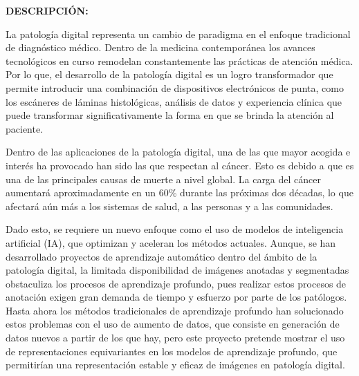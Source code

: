 \documentclass[12pt,letterpaper,final, openany]{scrbook}
\begin{document}
\textbf{DESCRIPCIÓN:}


La patología digital representa un cambio de paradigma en el enfoque tradicional de diagnóstico médico. Dentro de la medicina contemporánea los avances tecnológicos en curso remodelan constantemente las prácticas de atención médica. Por lo que, el desarrollo de la patología digital es un logro transformador que permite introducir una combinación de dispositivos electrónicos de punta, como los escáneres de  láminas histológicas, análisis de datos y experiencia clínica que puede transformar significativamente la forma en que se brinda la atención al paciente.

Dentro de las aplicaciones de la patología digital, una de las que mayor acogida e interés ha provocado han sido las que respectan al cáncer. Esto es debido a que es una de las principales causas de muerte a nivel global. La carga del cáncer aumentará aproximadamente en un 60\% durante las próximas dos décadas, lo que afectará aún más a los sistemas de salud, a las personas y a las comunidades.

Dado esto, se requiere un nuevo enfoque como el uso de modelos de inteligencia artificial (IA), que optimizan y aceleran los métodos actuales. Aunque, se han desarrollado proyectos de aprendizaje automático dentro del ámbito de la patología digital, la limitada disponibilidad de imágenes anotadas y segmentadas obstaculiza los procesos de aprendizaje profundo, pues realizar estos procesos de anotación exigen gran demanda de tiempo y esfuerzo por parte de los patólogos. Hasta ahora los métodos tradicionales de aprendizaje profundo han solucionado estos problemas con el uso de aumento de datos, que consiste en generación de datos nuevos a partir de los que hay, pero este proyecto pretende mostrar el uso de representaciones equivariantes en los modelos de aprendizaje profundo, que permitirían una representación estable y eficaz de imágenes en patología digital.
\end{document}
